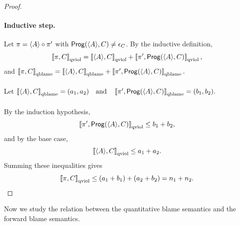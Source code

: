 \begin{proof}
            \paragraph{Inductive step.}
            Let $\pi=\langle A \rangle \circ \pi'$ with $\mathsf{Prog}(\langle A \rangle ,C)\neq\epsilon_{C}$.
            By the inductive definition,
            \[
            \left\llbracket \pi,C \right\rrbracket_{\text{qviol}}
            =
            \left\llbracket \langle A \rangle ,C \right\rrbracket_{\text{qviol}}
            +
            \left\llbracket \pi',\mathsf{Prog}(\langle A \rangle ,C) \right\rrbracket_{\text{qviol}},
            \]
            and
            $
            \left\llbracket \pi,C \right\rrbracket_{\text{qblame}}
            =
            \left\llbracket \langle A \rangle ,C \right\rrbracket_{\text{qblame}}
            +
            \left\llbracket \pi',\mathsf{Prog}(\langle A \rangle ,C) \right\rrbracket_{\text{qblame}}.
            $\\ \\
            Let
            $
            \left\llbracket \langle A \rangle ,C \right\rrbracket_{\text{qblame}}=(a_1,a_2)
            \quad\text{and}\quad
            \left\llbracket \pi',\mathsf{Prog}(\langle A \rangle ,C) \right\rrbracket_{\text{qblame}}=(b_1,b_2).
            $\\ \\
            By the induction hypothesis,
            \[
            \left\llbracket \pi',\mathsf{Prog}(\langle A \rangle ,C) \right\rrbracket_{\text{qviol}} \le b_1+b_2,
            \]
            and by the base case,
            \[
            \left\llbracket \langle A \rangle ,C \right\rrbracket_{\text{qviol}} \le a_1+a_2.
            \]
            Summing these inequalities gives
            \[
            \left\llbracket \pi,C \right\rrbracket_{\text{qviol}} \le (a_1+b_1)+(a_2+b_2) = n_1+n_2.
            \]
            \end{proof}

            Now we study the relation between the quantitative blame semantics and the forward blame semantics.


